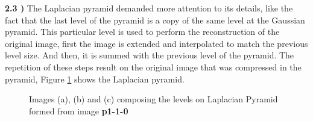 \documentclass[12pt,a4paper]{article}
\begin{document}
\textbf{2.3 )} The Laplacian pyramid demanded more attention to its details, like the fact that the last level of the pyramid is a copy of the same level at the Gaussian pyramid. This particular level is used to perform the reconstruction of the original image, first the image is extended and interpolated to match the previous level size. And then, it is summed with the previous level of the pyramid. The repetition of these steps result on the original image that was compressed in the pyramid, Figure \ref{fig:placePyramid} shows the Laplacian pyramid. \\

\begin{figure}[!h]
	\centering
	\quad
	\quad
	\caption{Images (a), (b) and (c) composing the levels on Laplacian Pyramid formed from image \textbf{p1-1-0}}
	\label{fig:placePyramid}
\end{figure}
\end{document}
